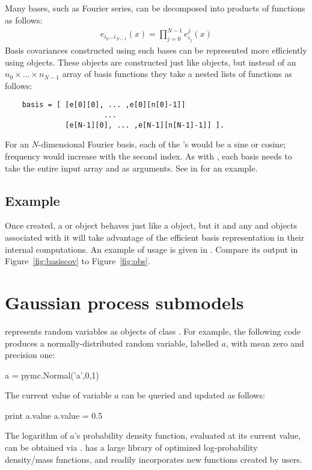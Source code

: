 \documentclass[article]{jss}
\begin{document}
Many bases, such as Fourier series, can be decomposed into products of functions as follows:
\begin{eqnarray*}
    e_{i_0\ldots i_{N-1}}(x) = \prod_{j=0}^{N-1}e_{i_j}^j(x)
\end{eqnarray*}
Basis covariances constructed using such bases can be represented more efficiently using  objects. These objects are constructed just like  objects, but instead of an $n_0\times \ldots \times n_{N-1}$ array of basis functions they take a nested lists of functions as follows:
\begin{verbatim}
    basis = [ [e[0][0], ... ,e[0][n[0]-1]]
                       ...
              [e[N-1][0], ... ,e[N-1][n[N-1]-1]] ].
\end{verbatim}
For an $N$-dimensional Fourier basis, each of the 's would be a sine or cosine; frequency would increase with the second index. As with , each basis needs to take the entire input array  and  as arguments. See  in  for an example.

\subsection{Example}

Once created, a  or  object behaves just like a  object, but it and any  and  objects associated with it will take advantage of the efficient basis representation in their internal computations. An example of  usage is given in . Compare its output in Figure~\ref{fig:basiscov} to Figure~\ref{fig:obs}.


\section{Gaussian process submodels}
\label{sec:gp-sub} 

 represents random variables as objects of class . For example, the following code produces a normally-distributed random variable, labelled $a$, with mean zero and precision one:
\begin{CodeChunk}
\begin{CodeInput}
a = pymc.Normal('a',0,1)
\end{CodeInput}
\end{CodeChunk}
The current value of variable $a$ can be queried and updated as follows:
\begin{CodeChunk}
\begin{CodeInput}
print a.value
a.value = 0.5
\end{CodeInput}
\end{CodeChunk}
The logarithm of $a$'s probability density function, evaluated at its current value, can be obtained via .  has a large library of optimized log-probability density/mass functions, and readily incorporates new functions created by users.
\end{document}
